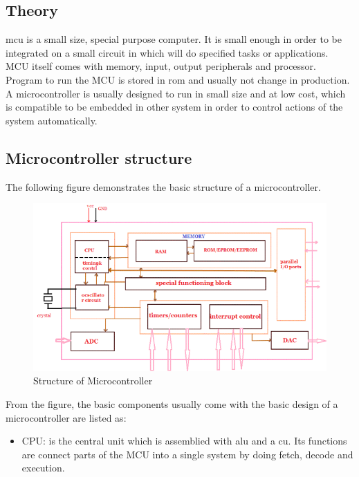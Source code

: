 % 
  \subsection{Theory}
  \gls{mcu} is a small size, special purpose computer. It is small enough in order to be integrated on a small circuit in which will do specified tasks or applications. MCU itself comes with memory, input, output peripherals and processor. Program to run the MCU is stored in \gls{rom} and usually not change in production. A microcontroller is usually designed to run in small size and at low cost, which is compatible to be embedded in other system in order to control actions of the system automatically.

  \subsection{Microcontroller structure}
  The following figure demonstrates the basic structure of a microcontroller.
  \begin{figure}[h!]
    \includegraphics[scale=0.9]{images/Microcontroller-Structure.png}
    \caption{Structure of Microcontroller}
  \end{figure}
  
  From the figure, the basic components usually come with the basic design of a microcontroller are listed as:
  \begin{itemize}
    \item CPU: is the central unit which is assemblied with \gls{alu} and a \gls{cu}. Its functions are connect parts of the MCU into a single system by doing fetch, decode and execution.
  \end{itemize}


